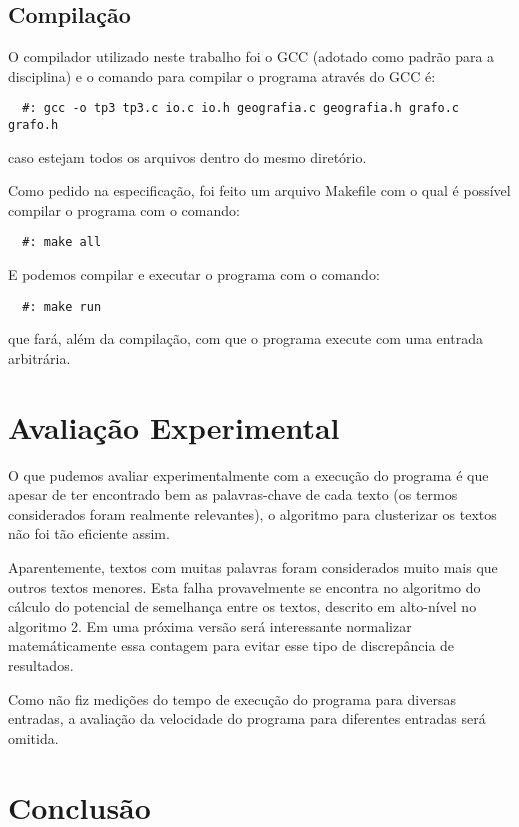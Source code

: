 \documentclass[12pt]{article}
\begin{document}
\subsection{Compilação}
O compilador utilizado neste trabalho foi o GCC (adotado como padrão para a disciplina) e 
o comando para compilar o programa através do GCC é:
\begin{verbatim}
  #: gcc -o tp3 tp3.c io.c io.h geografia.c geografia.h grafo.c grafo.h
\end{verbatim}
caso estejam todos os arquivos dentro do mesmo diretório.

Como pedido na especificação, foi feito um arquivo Makefile com o qual é possível compilar
o programa com o comando: 
\begin{verbatim}
  #: make all
\end{verbatim}

E podemos compilar e executar o programa com o comando:
\begin{verbatim}
  #: make run
\end{verbatim}
que fará, além da compilação, com que o programa execute com uma entrada arbitrária.

\section{Avaliação Experimental}
\label{avaliacao_experimental}

O que pudemos avaliar experimentalmente com a execução do programa é que apesar de ter 
encontrado bem as palavras-chave de cada texto (os termos considerados foram realmente 
relevantes), o algoritmo para clusterizar os textos não foi tão eficiente assim.

Aparentemente, textos com muitas palavras foram considerados muito mais que outros textos 
menores. Esta falha provavelmente se encontra no algoritmo do cálculo do potencial de 
semelhança entre os textos, descrito em alto-nível no algoritmo 2. Em uma próxima versão 
será interessante normalizar matemáticamente essa contagem para evitar esse tipo de 
discrepância de resultados.

Como não fiz medições do tempo de execução do programa para diversas entradas, a avaliação
da velocidade do programa para diferentes entradas será omitida.

\section{Conclusão}
\label{conclusao}
\end{document}
